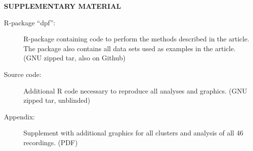 \documentclass[12pt]{article}
\begin{document}
\bigskip
\begin{center}
{\large\bf SUPPLEMENTARY MATERIAL}
\end{center}

\begin{description}

\item[R-package ``dpf'':] R-package containing code to perform the
  methods described in the article. The package also contains all data
  sets used as examples in the article. (GNU zipped tar, also on
  Github)
  
\item[Source code:] Additional R code necessary to reproduce all
  analyses and graphics. (GNU zipped tar, unblinded)

\item[Appendix:] Supplement with additional graphics for all clusters
  and analysis of all 46 recordings. (PDF)

\end{description}


\clearpage





\end{document}

